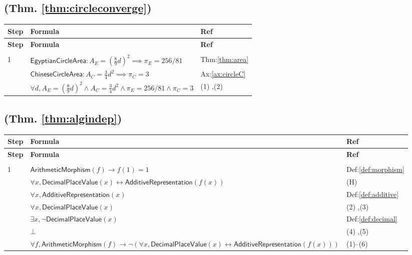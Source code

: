 \documentclass[12pt]{amsart}
\newcommand{\br}{,\allowbreak}
\newenvironment{prooftable}{%
	\renewcommand{\arraystretch}{1.2}%
	\setlength{\tabcolsep}{4pt}%
	\setlength{\arrayrulewidth}{0.05pt}
	\tiny
	\sloppy
	\begin{longtable}{
			|>{\centering\arraybackslash}m{0.7cm}|
			>{\raggedright\centering\arraybackslash}m{0.70\textwidth}|
			>{\centering\arraybackslash}m{3.5cm}|  %
		}%
		\hline
		\textbf{Step} & \centering\textbf{Formula} & \textbf{Ref} \\
		\hline
		\endfirsthead
		\hline
		\textbf{Step} & \centering\textbf{Formula} & \textbf{Ref} \\
		\hline
		\endhead
		\hline
		\multicolumn{3}{r}{\textit{Continued on next page}} \\
		\endfoot
		\hline
		\endlastfoot
	}{%
	\end{longtable}%
}
\begin{document}
\subsection{(Thm. \ref{thm:circleconverge})}
\begin{prooftable}
	1 & $\textsf{EgyptianCircleArea}: A_E = \left(\frac{8}{9}d\right)^2 \implies \pi_E = 256/81$ & Thm:\ref{thm:area} \\[3pt] \hline
	2 & $\textsf{ChineseCircleArea}: A_C = \frac{3}{4}d^2 \implies \pi_C = 3$ & Ax:\ref{ax:circleC} \\[3pt] \hdashline
	& $\forall d \br  A_E = \left(\frac{8}{9}d\right)^2 \wedge A_C = \frac{3}{4}d^2 \wedge \pi_E = 256/81 \wedge \pi_C = 3$ & (1) \br (2)
\end{prooftable}

\subsection{(Thm. \ref{thm:algindep})}
\begin{prooftable}
	1 & $\textsf{ArithmeticMorphism}(f) \to f(1)=1$ & Def:\ref{def:morphism} \\[3pt] \hline
	2 & $\forall x \br  \textsf{DecimalPlaceValue}(x) \leftrightarrow \textsf{AdditiveRepresentation}(f(x))$ & (H) \\[3pt] \hline
	3 & $\forall x \br  \textsf{AdditiveRepresentation}(x)$ & Def:\ref{def:additive} \\[3pt] \hline
	4 & $\forall x \br  \textsf{DecimalPlaceValue}(x)$ & (2) \br (3) \\[3pt] \hline
	5 & $\exists x \br  \neg \textsf{DecimalPlaceValue}(x)$ & Def:\ref{def:decimal} \\[3pt] \hline
	6 & $\bot$ & (4) \br (5) \\[3pt] \hdashline
	& $\forall f \br  \textsf{ArithmeticMorphism}(f) \to \neg \left( \forall x \br  \textsf{DecimalPlaceValue}(x) \leftrightarrow \textsf{AdditiveRepresentation}(f(x)) \right)$ & (1)--(6)
\end{prooftable}
\end{document}
